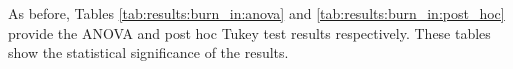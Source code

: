 As before, Tables \ref{tab:results:burn_in:anova} and \ref{tab:results:burn_in:post_hoc} provide the ANOVA and post hoc Tukey test results respectively. These tables show the statistical significance of the results. 

\begin{table}[htbp]
	\centering
	\caption{ANOVA - Rank - BHH Variant: Burn In}
	\label{tab:results:burn_in:anova}%
	\par\bigskip
\end{table}


